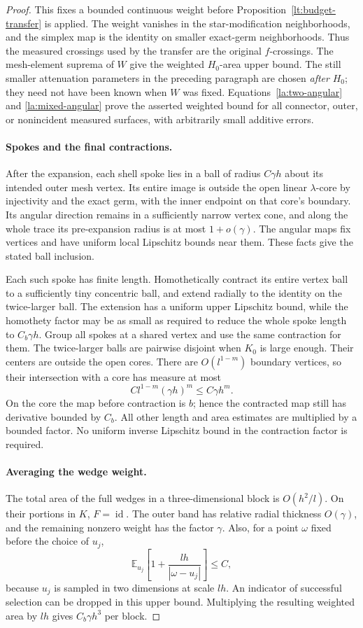\documentclass[11pt]{article}
\numberwithin{equation}{section}
\theoremstyle{definition}
\theoremstyle{remark}
\begin{document}
\begin{proof}
This fixes a bounded continuous weight before
Proposition~\ref{lt:budget-transfer} is applied.  The weight vanishes in
the star-modification neighborhoods, and the simplex map is the
identity on smaller exact-germ neighborhoods.  Thus the measured
crossings used by the transfer are the original $f$-crossings.  The
mesh-element suprema of $W$ give the weighted $H_0$-area upper bound.
The still smaller attenuation parameters in the preceding paragraph
are chosen \emph{after} $H_0$; they need not have been known when $W$
was fixed.  Equations~\eqref{la:two-angular} and
\eqref{la:mixed-angular} prove the asserted weighted bound for all
connector, outer, or nonincident measured surfaces, with arbitrarily
small additive errors.

\paragraph{Spokes and the final contractions.}
After the expansion, each shell spoke lies in a ball of radius
$C\gamma h$ about its intended outer mesh vertex.  Its entire image is outside the open linear $\lambda$-core by
injectivity and the exact germ, with the inner endpoint on that
core's boundary.  Its angular direction remains in a sufficiently
narrow vertex cone, and along the whole trace its pre-expansion
radius is at most $1+o(\gamma)$.  The angular maps fix vertices and have uniform local
Lipschitz bounds near them.  These facts give the stated ball
inclusion.

Each such spoke has finite length.  Homothetically contract its
entire vertex ball to a sufficiently tiny concentric ball, and extend
radially to the identity on the twice-larger ball.  The extension has
a uniform upper Lipschitz bound, while the homothety factor may be as
small as required to reduce the whole spoke length to
$C_b\gamma h$.  Group all spokes at a shared vertex and use the same
contraction for them.  The twice-larger balls are pairwise disjoint
when $K_0$ is large enough.  Their centers are outside the open cores.
There are $O(l^{1-m})$ boundary vertices, so their intersection with
a core has measure at most
\[
 C l^{1-m}(\gamma h)^m\le C\gamma h^m.
\]
On the core the map before contraction is $b$; hence the contracted
map still has derivative bounded by $C_b$.  All other length and
area estimates are multiplied by a bounded factor.  No uniform
inverse Lipschitz bound in the contraction factor is required.

\paragraph{Averaging the wedge weight.}
The total area of the full wedges in a three-dimensional block is
$O(h^2/l)$.  On their portions in $K$, $F=\operatorname{id}$.  The outer band has
relative radial thickness $O(\gamma)$, and the remaining nonzero
weight has the factor $\gamma$.  Also, for a point $\omega$ fixed
before the choice of $u_j$,
\[
 \mathbb E_{u_j}\left[1+\frac{lh}{|\omega-u_j|}\right]\le C,
\]
because $u_j$ is sampled in two dimensions at scale $lh$.  An
indicator of successful selection can be dropped in this upper
bound.  Multiplying the resulting weighted area by $lh$ gives
$C_b\gamma h^3$ per block.


\end{proof}
\end{document}
